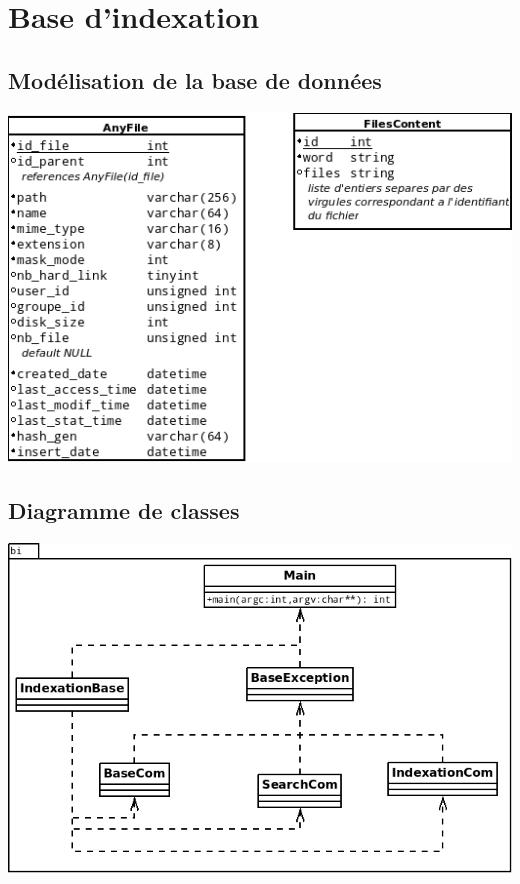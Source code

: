 \section{Base d'indexation}

\subsection{Modélisation de la base de données}\label{bdd}
\begin{center}
\includegraphics[scale=0.6]{"images/modelisation_bdd"}
\end{center}

\subsection{Diagramme de classes}\label{diagramme_classes_bi}
\begin{center}
\includegraphics[scale=0.46]{"images/diagramme_classes_bi"}
\end{center}

